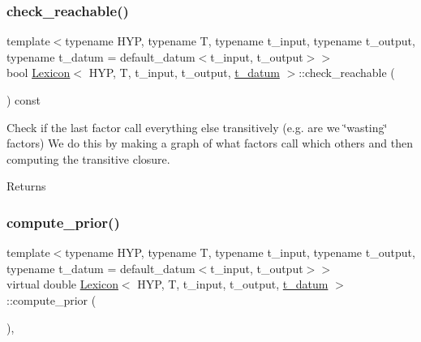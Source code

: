 \mbox{\label{class_lexicon_aeb3e5f9f75e43f2147a22dee67fc8527}} 
\subsubsection{\texorpdfstring{check\+\_\+reachable()}{check\_reachable()}}
{\footnotesize\ttfamily template$<$typename H\+YP, typename T, typename t\+\_\+input, typename t\+\_\+output, typename t\+\_\+datum = default\+\_\+datum$<$t\+\_\+input, t\+\_\+output$>$$>$ \\
bool \hyperlink{class_lexicon}{Lexicon}$<$ H\+YP, T, t\+\_\+input, t\+\_\+output, \hyperlink{class_bayesable_a7c93a2eeab708378eb321745908718d4}{t\+\_\+datum} $>$\+::check\+\_\+reachable (\begin{DoxyParamCaption}{ }\end{DoxyParamCaption}) const\hspace{0.3cm}{\ttfamily [inline]}}

Check if the last factor call everything else transitively (e.\+g. are we \char`\"{}wasting\char`\"{} factors) We do this by making a graph of what factors call which others and then computing the transitive closure. \begin{DoxyReturn}{Returns}

\end{DoxyReturn}
\mbox{\label{class_lexicon_a1ac27e460a361cc90566b92365909324}} 
\subsubsection{\texorpdfstring{compute\+\_\+prior()}{compute\_prior()}}
{\footnotesize\ttfamily template$<$typename H\+YP, typename T, typename t\+\_\+input, typename t\+\_\+output, typename t\+\_\+datum = default\+\_\+datum$<$t\+\_\+input, t\+\_\+output$>$$>$ \\
virtual double \hyperlink{class_lexicon}{Lexicon}$<$ H\+YP, T, t\+\_\+input, t\+\_\+output, \hyperlink{class_bayesable_a7c93a2eeab708378eb321745908718d4}{t\+\_\+datum} $>$\+::compute\+\_\+prior (\begin{DoxyParamCaption}{ }\end{DoxyParamCaption})\hspace{0.3cm}{\ttfamily [inline]}, {\ttfamily [virtual]}}



